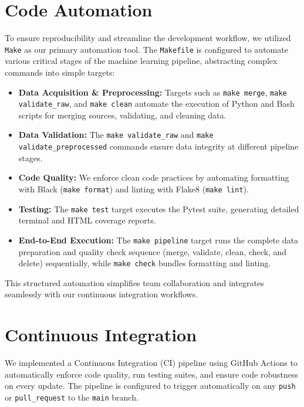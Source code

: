\documentclass[12pt, a4paper]{article}
\begin{document}
\section{Code Automation}
To ensure reproducibility and streamline the development workflow, we utilized \texttt{Make} as our primary automation tool. The \texttt{Makefile} is configured to automate various critical stages of the machine learning pipeline, abstracting complex commands into simple targets:
\begin{itemize}
    \item \textbf{Data Acquisition \& Preprocessing:} Targets such as \texttt{make merge}, \texttt{make validate\_raw}, and \texttt{make clean} automate the execution of Python and Bash scripts for merging sources, validating, and cleaning data.
    \item \textbf{Data Validation:} The \texttt{make validate\_raw} and \texttt{make validate\_preprocessed} commands ensure data integrity at different pipeline stages.
    \item \textbf{Code Quality:} We enforce clean code practices by automating formatting with Black (\texttt{make format}) and linting with Flake8 (\texttt{make lint}).
    \item \textbf{Testing:} The \texttt{make test} target executes the Pytest suite, generating detailed terminal and HTML coverage reports.
    \item \textbf{End-to-End Execution:} The \texttt{make pipeline} target runs the complete data preparation and quality check sequence (merge, validate, clean, check, and delete) sequentially, while \texttt{make check} bundles formatting and linting.
\end{itemize}
This structured automation simplifies team collaboration and integrates seamlessly with our continuous integration workflows.

\newpage
\section{Continuous Integration}
We implemented a Continuous Integration (CI) pipeline using GitHub Actions to automatically enforce code quality, run testing suites, and ensure code robustness on every update. The pipeline is configured to trigger automatically on any \texttt{push} or \texttt{pull\_request} to the \texttt{main} branch.
\end{document}
